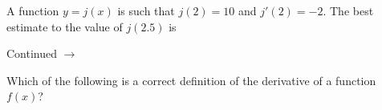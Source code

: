 \documentclass[addpoints]{exam}
\def\pageturn{\vfill
\begin{flushright}
	\begin{small}
		Continued $\rightarrow$
	\end{small}
\end{flushright}
\newpage}
\begin{document}
\begin{questions}

\question[2] A function $y = j(x)$ is such that $j(2) = 10$ and $j'(2) = -2$. The best  estimate to the value of $j(2.5)$ is 
			
\pageturn

\question[2] Which of the following is a correct definition of the derivative of a function $f(x)$? 
\end{questions}
\end{document}
